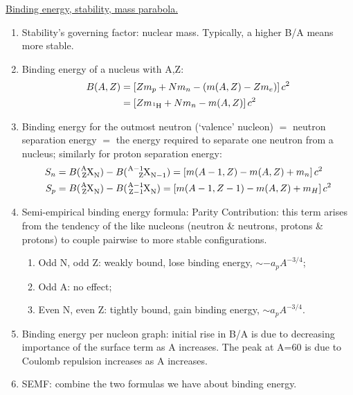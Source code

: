 \documentclass{school-22.101-notes}
\begin{document}
\clearpage

\uline{Binding energy, stability, mass parabola.}
\begin{enumerate}
\item Stability's governing factor: nuclear mass. Typically, a higher B/A means more stable.
\item Binding energy of a nucleus with A,Z:
\begin{align} 
B(A,Z) &= \left[ Z m_p + N m_n - (m(A,Z) - Z m_e) \right] c^2 \\
&= \left[ Z m_{\ce{^1 H}} + N m_n - m(A,Z) \right] c^2
\end{align}
\item Binding energy for the outmost neutron (`valence' nucleon) $=$ neutron separation energy $=$ the energy required to separate one neutron from a nucleus; similarly for proton separation energy: 
\begin{align}
S_n &= B(\ce{^A_Z X_N}) -B(\ce{^{A-1}_Z X_{N-1}}) = \left[ m(A-1, Z) - m(A,Z) + m_n \right] c^2 \\
S_p &= B(\ce{^A_Z X_N}) -B(\ce{^{A-1}_{Z-1} X_{N}}) = \left[ m(A-1, Z-1) - m(A,Z) + m_{H} \right] c^2
\end{align}
\item Semi-empirical binding energy formula:
    Parity Contribution: this term arises from the tendency of the like nucleons (neutron \& neutrons, protons \& protons) to couple pairwise to more stable configurations.
    \begin{enumerate}
    \item Odd N, odd Z: weakly bound, lose binding energy, $\sim -a_p A^{-3/4}$;
    \item Odd A: no effect;
    \item Even N, even Z: tightly bound, gain binding energy, $\sim a_p A^{-3/4}$.
    \end{enumerate}
\item Binding energy per nucleon graph: initial rise in B/A is due to decreasing importance of the surface term as A increases. The peak at A=60 is due to Coulomb repulsion increases as A increases.     
\item SEMF: combine the two formulas we have about binding energy. 

\end{enumerate}
\end{document}

